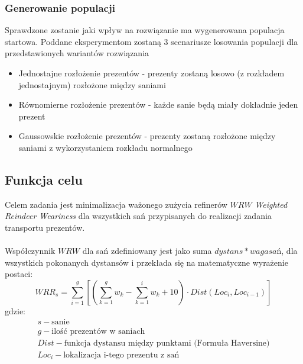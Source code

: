 \documentclass[titlepage]{article}
\begin{document}
            \subsubsection{
                Generowanie populacji
            }
                Sprawdzone zostanie jaki wpływ na rozwiązanie ma wygenerowana populacja startowa. 
                Poddane eksperymentom zostaną 3 scenariusze losowania populacji dla przedstawionych wariantów rozwiązania

                \begin{itemize}
                    \item Jednostajne rozłożenie prezentów - prezenty zostaną losowo (z rozkładem jednostajnym) rozłożone między saniami
                    \item Równomierne rozłożenie prezentów - każde sanie będą miały dokładnie jeden prezent
                    \item Gaussowskie rozłożenie prezentów - prezenty zostaną rozłożone między saniami z wykorzystaniem rozkładu normalnego
                \end{itemize}

        \subsection{
            Funkcja celu
        }
            Celem zadania jest minimalizacja ważonego zużycia refinerów $WRW$ \textit{Weighted Reindeer Weariness}
            dla wszystkich sań przypisanych do realizacji zadania transportu prezentów. \\ \\
            Współczynnik $WRW$ dla sań zdefiniowany jest jako suma $dystans * waga sań$,
            dla wszystkich pokonanych dystansów i przekłada się na matematyczne wyrażenie postaci:
            \[
                WRR_{s} = \sum^{g}_{i=1} [
                    (
                        \sum^{g}_{k=1} w_{k} - 
                        \sum^{i}_{k=1} w_{k} + 10
                    ) \cdot
                    Dist(Loc_{i}, Loc_{i-1})
                ]
            \]
            gdzie:
            \[
                \begin{array}{l}
                    s - \mbox{sanie} \\
                    g - \mbox{ilość prezentów w saniach} \\
                    Dist - \mbox{funkcja dystansu między punktami (Formuła Haversine)} \\
                    Loc_{i} - \mbox{lokalizacja i-tego prezentu z sań} \\
                \end{array}
            \]
            \\
\end{document}

